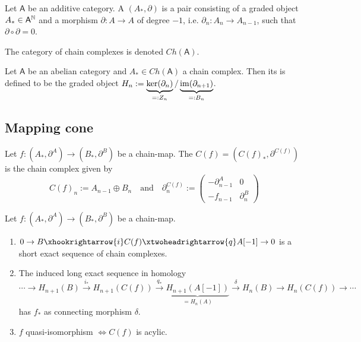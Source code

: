 \documentclass[fontsize=11pt,fleqn,a4paper]{scrartcl}
\begin{document}
\begin{definition}
Let $\mathsf{A}$ be an additive category. A  $(A_\ast,\partial)$ is a pair consisting of a graded object $A_\ast\in\mathsf{A}^{\mathbb{N}}$ and a morphism $\partial: A\to A$ of degree $-1$, i.e. $\partial_n : A_n \to A_{n-1}$, such that $\partial\circ\partial=0$.

The category of chain complexes is denoted $Ch(\mathsf{A})$.
\end{definition}

\begin{definition}[Homology]
Let $\mathsf{A}$ be an abelian category and $A_\ast\in Ch(\mathsf{A})$ a chain complex. Then its  is defined to be the graded object $H_n := \underbrace{\ker(\partial_n)}_{=:Z_n} / \underbrace{\operatorname{im}(\partial_{n+1})}_{=:B_n}$.
\end{definition}

\subsection{Mapping cone}

\begin{definition}
Let $f:(A_\ast,\partial^A)\to(B_\ast,\partial^B)$ be a chain-map. The  $C(f)=(C(f)_\ast,\partial^{C(f)})$ is the chain complex given by
\[C(f)_n := A_{n-1} \oplus B_n \quad\text{and}\quad \partial_n^{C(f)} := \begin{pmatrix}-\partial_{n-1}^A & 0 \\ -f_{n-1} & \partial_n^B \end{pmatrix}\]
\end{definition}

\begin{lemma}
Let $f:(A_\ast,\partial^A)\to(B_\ast,\partial^B)$ be a chain-map.
\begin{enumerate}
\item $0 \to B \xhookrightarrow{i} C(f) \xtwoheadrightarrow{q} A[-1] \to 0$ is a short exact sequence of chain complexes.
\item The induced long exact sequence in homology
\[\cdots \to H_{n+1}(B) \xrightarrow{i_\ast} H_{n+1}(C(f)) \xrightarrow{q_\ast} \underbrace{H_{n+1}(A[-1])}_{=H_n(A)} \xrightarrow{\delta} H_n(B) \to H_n(C(f)) \to \cdots\]
has $f_\ast$ as connecting morphism $\delta$.
\item $f$ quasi-isomorphism $\iff C(f)$ is acylic.
\end{enumerate}
\end{lemma}
\end{document}
